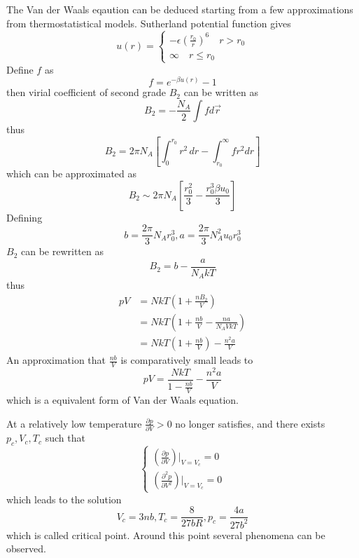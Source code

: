 \documentclass[%
 reprint,
 amsmath,amssymb,
 aps,
10.5pt,
]{revtex4-1}
\begin{document}
The Van der Waals eqaution can be deduced starting from a few approximations from thermostatistical models. Sutherland potential function gives
\begin{equation}
	u(r) = 
	\begin{cases}
	-\epsilon(\frac{{r_0}}{r})^6 \quad r>{r_0}\\
	\infty \quad r\leqslant {r_0}
	\end{cases}
\end{equation}
Define $f$ as
\begin{equation}
	f = e^{-\beta u(r)}-1
\end{equation}
then virial coefficient of second grade $B_2$ can be written as
\begin{equation}
	B_2 = - \frac{N_A}{2}\int f d \overrightarrow{r}
\end{equation}
thus
\begin{equation}
	B_2  = 2\pi N_A \left[\int_0^{r_0} r^2 \, dr - \int_{r_0}^\infty f r^2 dr \right]
\end{equation}
which can be approximated as
\begin{equation}
	B_2 \sim  2\pi N_A \left[\frac{r_0^2}{3} - \frac{r_0^3 \beta u_0}{3}\right]
\end{equation}
Defining
\begin{equation}
	b = \frac{2\pi}{3}N_A r_0^3 , a = \frac{2\pi}{3}N_A^2 u_0 r_0^3
\end{equation}
$B_2$ can be rewritten as 
\begin{equation}
	B_2 = b- \frac{a}{N_A k T}
\end{equation}
thus
\begin{align*}
	pV & =  N k T \left(1+\frac{n B_2}{V}\right) \\
 	& = N k T \left(1 + \frac{n b}{V} - \frac{n a}{N_A V k T }\right) \\
 	&=  NkT\left(1+\frac{n b }{V}\right) - \frac{n^2 a}{V} 
\end{align*}
An approximation that $\frac{n b}{V}$ is comparatively small leads to
\begin{equation}
	pV = \frac{N k T}{1-\frac{nb}{V}} - \frac{n^2 a}{V}
\end{equation}
which is a equivalent form of Van der Waals equation.

At a relatively low temperature $\frac{\partial p}{\partial V} > 0$ no longer satisfies, and there exists $p_c,V_c,T_c$ such that
\begin{equation}
\begin{cases}
	\left(\frac{\partial p}{\partial V}\right)\bigg|_{V=V_c} = 0 \\
	\left(\frac{\partial^2 p}{\partial V^2}\right)\bigg|_{V=V_c} =0
\end{cases}
\end{equation}
which leads to the solution
\begin{equation}
	V_c = 3nb, T_c = \frac{8}{27 b R}, p_c = \frac{4 a}{27 b^2}
\end{equation}
which is called critical point. Around this point several phenomena can be observed.
\end{document}
